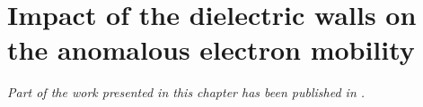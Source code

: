  

\clearpage
\ifodd\value{page}\else
  \thispagestyle{empty}
\fi


\chapter[Study of dielectric impact on mobility]{Impact of the dielectric walls on the anomalous electron mobility }
\label{ch-2}

\begin{Chabstract}

\emph{
Part of the work presented in this chapter has been published in \citet{tavant2018}.}
\end{Chabstract}
\vspace{1ex}

\begin{Chabstract}
\lipsum[1-2]
\end{Chabstract}


\minitoc





